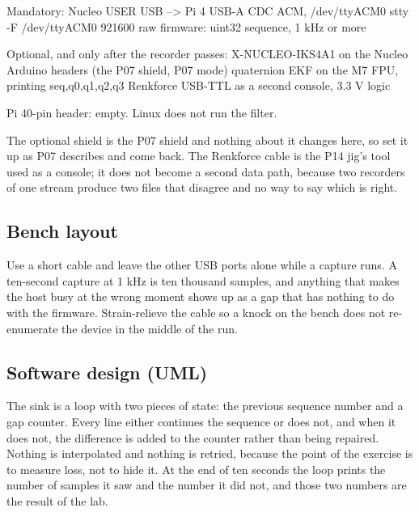 \begin{asciiart}
Mandatory:
  Nucleo USER USB  -->  Pi 4 USB-A        CDC ACM, /dev/ttyACM0
  stty -F /dev/ttyACM0 921600 raw
  firmware: uint32 sequence, 1 kHz or more

Optional, and only after the recorder passes:
  X-NUCLEO-IKS4A1 on the Nucleo Arduino headers   (the P07 shield, P07 mode)
  quaternion EKF on the M7 FPU, printing seq,q0,q1,q2,q3
  Renkforce USB-TTL as a second console, 3.3 V logic

Pi 40-pin header: empty.  Linux does not run the filter.
\end{asciiart}

The optional shield is the P07 shield and nothing about it changes here, so set it up as
P07 describes and come back. The Renkforce cable is the P14 jig's tool used as a console;
it does not become a second data path, because two recorders of one stream produce two
files that disagree and no way to say which is right.

\subsection*{Bench layout}


Use a short cable and leave the other USB ports alone while a capture runs. A ten-second
capture at 1 kHz is ten thousand samples, and anything that makes the host busy at the
wrong moment shows up as a gap that has nothing to do with the firmware. Strain-relieve the
cable so a knock on the bench does not re-enumerate the device in the middle of the run.

\subsection*{Software design (UML)}


The sink is a loop with two pieces of state: the previous sequence number and a gap
counter. Every line either continues the sequence or does not, and when it does not, the
difference is added to the counter rather than being repaired. Nothing is interpolated and
nothing is retried, because the point of the exercise is to measure loss, not to hide it.
At the end of ten seconds the loop prints the number of samples it saw and the number it
did not, and those two numbers are the result of the lab.

